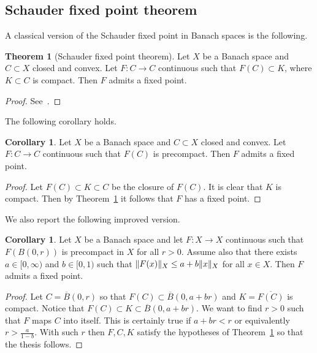 \documentclass[a4paper,10pt,twoside]{amsbook}
\numberwithin{section}{chapter}
\numberwithin{equation}{chapter}
\theoremstyle{definition}
\newtheorem{thm}[prop]{Theorem}
\newtheorem{cor}[prop]{Corollary}
\DeclarePairedDelimiter{\norm}{\lVert}{\rVert}
\begin{document}
%

\subsection{Schauder fixed point theorem}

A classical version of the Schauder fixed point in Banach spaces is the following.
\begin{thm}[Schauder fixed point theorem]
\label{thm:schauder}
Let $X$ be a Banach space and $C\subset X$ closed and convex. Let $F\colon C\to C$ continuous such that $F(C)\subset K$, where $K\subset C$ is compact. Then $F$ admits a fixed point.
\end{thm}
\begin{proof}
See~\cite{niremberg}.
\end{proof}
The following corollary holds.
\begin{cor}
\label{cor:schauder}
Let $X$ be a Banach space and $C\subset X$ closed and convex. Let $F\colon C\to C$ continuous such that $F(C)$ is precompact. Then $F$ admits a fixed point.
\end{cor}
\begin{proof}
Let $F(C)\subset K\subset C$ be the closure of $F(C)$. It is clear that $K$ is compact. Then by Theorem~\ref{thm:schauder} it follows that $F$ has a fixed point.
\end{proof}
We also report the following improved version.
\begin{cor}
\label{cor:schauder-improved}
Let $X$ be a Banach space and let $F\colon X\to X$ continuous such that $F(B(0,r))$ is precompact in $X$ for all $r>0$. Assume also that there exists $a\in[0,\infty)$ and $b\in[0,1)$ such that $\norm{F(x)}_X\le a+b\norm{x}_X$ for all $x\in X$. Then $F$ admits a fixed point.
\end{cor}
\begin{proof}
Let $C=\overline{B}(0,r)$ so that $F(C)\subset\overline{B}(0,a+br)$ and $K=\overline{F(C)}$ is compact. Notice that $F(C)\subset K\subset\overline{B}(0,a+br)$. We want to find $r>0$ such that $F$ maps $C$ into itself. This is certainly true if $a+br<r$ or equivalently $r>\frac{a}{1-b}$. With such $r$ then $F,C,K$ satisfy the hypotheses of Theorem~\ref{thm:schauder} so that the thesis follows.
\end{proof}
\end{document}
